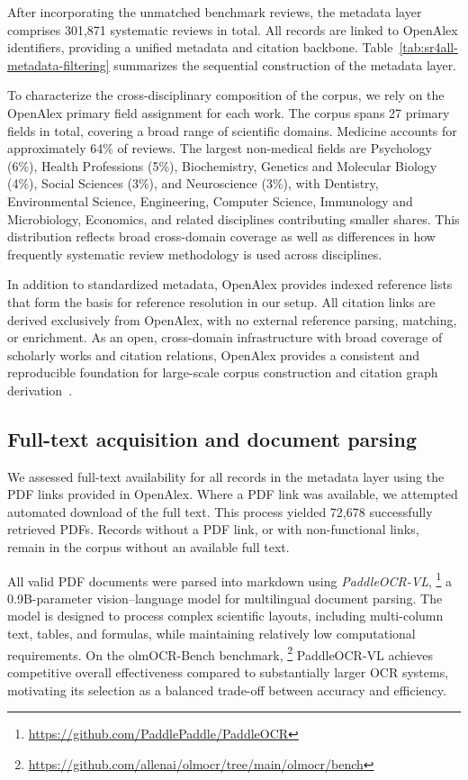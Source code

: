 After incorporating the unmatched benchmark reviews, the metadata layer comprises 301,871 systematic reviews in total. All records are linked to OpenAlex identifiers, providing a unified metadata and citation backbone. Table~\ref{tab:sr4all-metadata-filtering} summarizes the sequential construction of the metadata layer.

To characterize the cross-disciplinary composition of the corpus, we rely on the OpenAlex primary field assignment for each work. The corpus spans 27 primary fields in total, covering a broad range of scientific domains. Medicine accounts for approximately 64\% of reviews. The largest non-medical fields are Psychology (6\%), Health Professions (5\%), Biochemistry, Genetics and Molecular Biology (4\%), Social Sciences (3\%), and Neuroscience (3\%), with Dentistry, Environmental Science, Engineering, Computer Science, Immunology and Microbiology, Economics, and related disciplines contributing smaller shares. This distribution reflects broad cross-domain coverage as well as differences in how frequently systematic review methodology is used across disciplines.

In addition to standardized metadata, OpenAlex provides indexed reference lists that form the basis for reference resolution in our setup. All citation links are derived exclusively from OpenAlex, with no external reference parsing, matching, or enrichment. As an open, cross-domain infrastructure with broad coverage of scholarly works and citation relations, OpenAlex provides a consistent and reproducible foundation for large-scale corpus construction and citation graph derivation~\cite{culbert2025openalexrefcoverage}.



\subsection*{Full-text acquisition and document parsing}
We assessed full-text availability for all records in the metadata layer using the PDF links provided in OpenAlex. Where a PDF link was available, we attempted automated download of the full text. This process yielded 72,678 successfully retrieved PDFs. Records without a PDF link, or with non-functional links, remain in the corpus without an available full text.

All valid PDF documents were parsed into markdown using \textit{PaddleOCR-VL},%
\footnote{\url{https://github.com/PaddlePaddle/PaddleOCR}}
a 0.9B-parameter vision--language model for multilingual document parsing. The model is designed to process complex scientific layouts, including multi-column text, tables, and formulas, while maintaining relatively low computational requirements. On the olmOCR-Bench benchmark,%
\footnote{\url{https://github.com/allenai/olmocr/tree/main/olmocr/bench}}
PaddleOCR-VL achieves competitive overall effectiveness compared to substantially larger OCR systems, motivating its selection as a balanced trade-off between accuracy and efficiency.

